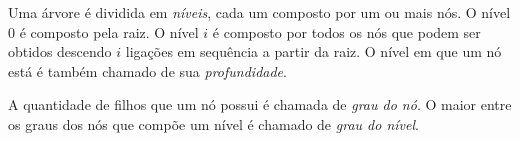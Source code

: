 Uma árvore é dividida em \textit{níveis}, cada um composto por um ou mais nós.
O nível 0 é composto pela raiz.
O nível $i$ é composto por todos os nós que podem ser obtidos descendo $i$ ligações em sequência a partir da raiz.
O nível em que um nó está é também chamado de sua \textit{profundidade}.

A quantidade de filhos que um nó possui é chamada de \textit{grau do nó}.
O maior entre os graus dos nós que compõe um nível é chamado de \textit{grau do nível}.




